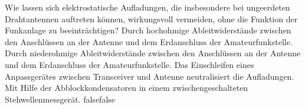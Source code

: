     {Wie lassen sich elektrostatische Aufladungen, die insbesondere bei ungeerdeten Drahtantennen auftreten können, wirkungsvoll vermeiden, ohne die Funktion der Funkanlage zu beeinträchtigen?}
    {Durch hochohmige Ableitwiderstände zwischen den Anschlüssen an der Antenne und dem Erdanschluss der Amateurfunkstelle.}
    {Durch niederohmige Ableitwiderstände zwischen den Anschlüssen an der Antenne und dem Erdanschluss der Amateurfunkstelle.}
    {Das Einschleifen eines Anpassgerätes zwischen Transceiver und Antenne neutralisiert die Aufladungen.}
    {Mit Hilfe der Abblockkondensatoren in einem zwischengeschalteten Stehwellenmessgerät.}
    {false}{false}